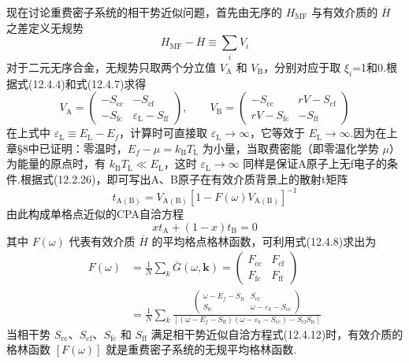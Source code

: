 现在讨论重费密子系统的相干势近似问题，首先由无序的 $H_{\mathrm{MF}}$ 与有效介质的 $\overline{H}$ 之差定义无规势
\begin{equation}
  H_{\mathrm{MF}}-\overline{H}\equiv\sum_{i}V_{i}
\end{equation}
对于二元无序合金，无规势只取两个分立值 $V_{\mathrm{A}}$ 和 $V_{\mathrm{B}}$，分别对应于取 $\xi_{i}$=1和0.根据式(12.4.4)和式(12.4.7)求得
\begin{equation}
  V_{\mathrm{A}}=
  \begin{pmatrix}-S_{\mathrm{cc}} & -S_{\mathrm{cf}}\\ -S_{\mathrm{fc}} & \varepsilon_{\mathrm{L}}-S_{\mathrm{ff}}\end{pmatrix},
  \qquad
  V_{\mathrm{B}}=
  \begin{pmatrix}-S_{\mathrm{cc}} & rV-S_{\mathrm{cf}}\\ rV-S_{\mathrm{fc}} & -S_{\mathrm{ff}}\end{pmatrix}
\end{equation}
在上式中 $\varepsilon_{\mathrm{L}}\equiv E_{\mathrm{L}}-E_{f}$，计算时可直接取 $\varepsilon_{\mathrm{L}}\rightarrow\infty$，它等效于 $E_{\mathrm{L}}\rightarrow\infty$.因为在上章§8中已证明：零温时，$E_{f}-\mu=k_{\mathrm{B}}T_{\mathrm{L}}$ 为小量，当取费密能（即零温化学势 $\mu$）为能量的原点时，有 $k_{\mathrm{B}}T_{\mathrm{L}}\ll E_{\mathrm{L}}$，这时 $\varepsilon_{\mathrm{L}}\rightarrow\infty$ 同样是保证A原子上无f电子的条件.根据式(12.2.26)，即可写出A、B原子在有效介质背景上的散射t矩阵
\begin{equation}
  t_{\mathrm{A}(\mathrm{B})}=V_{\mathrm{A}(\mathrm{B})}
  \left[1-F\left(\omega\right)V_{\mathrm{A}(\mathrm{B})}\right]^{-1}
\end{equation}
由此构成单格点近似的CPA自洽方程
\begin{equation}
  xt_{\mathrm{A}}+\left(1-x\right)t_{\mathrm{B}}=0
\end{equation}
其中 $F\left(\omega\right)$ 代表有效介质 $\overline{H}$ 的平均格点格林函数，可利用式(12.4.8)求出为
\begin{equation}
\begin{aligned}
  F\left(\omega\right)&=\frac{1}{N}\sum_{k}\overline{G}\left(\omega,\boldsymbol{k}\right)
  =\begin{pmatrix}F_{\mathrm{cc}} & F_{\mathrm{cf}}\\ F_{\mathrm{fc}} & F_{\mathrm{ff}}\end{pmatrix}\\
  &=\frac{1}{N}\sum_{k}
  \frac{\begin{pmatrix}\omega-E_{f}-S_{\mathrm{ff}} & S_{\mathrm{cf}}\\ S_{\mathrm{fc}} & \omega-\varepsilon_{k}-S_{\mathrm{cc}}\end{pmatrix}}
  {\left[\left(\omega-E_{f}-S_{\mathrm{ff}}\right)\left(\omega-\varepsilon_{k}-S_{\mathrm{cc}}\right)-S_{\mathrm{cf}}S_{\mathrm{fc}}\right]}
\end{aligned}
\end{equation}
当相干势 $S_{\mathrm{cc}}$、$S_{\mathrm{cf}}$、$S_{\mathrm{fc}}$ 和 $S_{\mathrm{ff}}$ 满足相干势近似自洽方程式(12.4.12)时，有效介质的格林函数 $\left[F\left(\omega\right)\right]$ 就是重费密子系统的无规平均格林函数.

